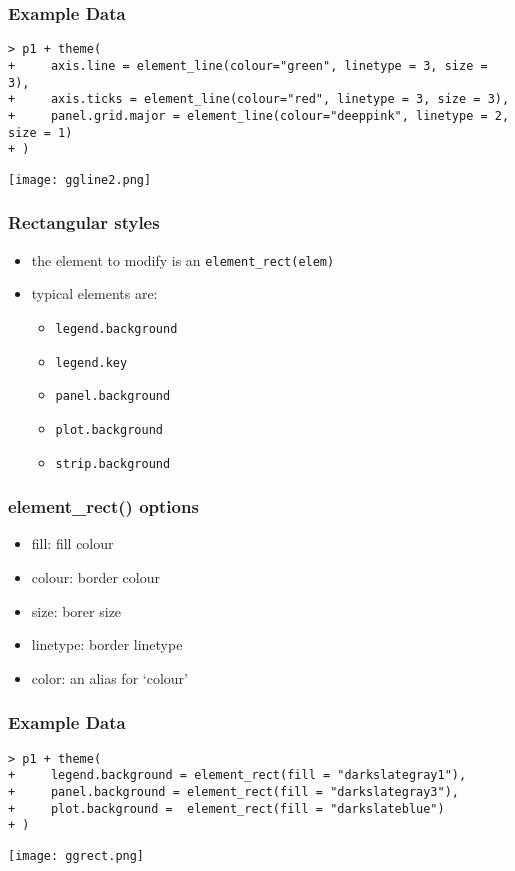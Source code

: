 \begin{frame}\frametitle{Example Data}
\scriptsize
\begin{verbatim}
> p1 + theme(
+     axis.line = element_line(colour="green", linetype = 3, size = 3),
+     axis.ticks = element_line(colour="red", linetype = 3, size = 3),
+     panel.grid.major = element_line(colour="deeppink", linetype = 2, size = 1)
+ )
\end{verbatim}
  \begin{center}
    \texttt{[image: ggline2.png]}
  \end{center}
\end{frame}



\begin{frame}\frametitle{Rectangular styles}
  \begin{itemize}
  \item the element to modify is an \texttt{element\_rect(elem)}
  \item typical elements are:
    \begin{itemize}
    \item \texttt{legend.background}
    \item \texttt{legend.key} 
    \item \texttt{panel.background}
    \item \texttt{plot.background}
    \item \texttt{strip.background}
    \end{itemize}
  \end{itemize}
\end{frame}

\begin{frame}\frametitle{element\_rect() options}
  \begin{itemize}
  \item fill: fill colour
  \item colour: border colour
  \item size: borer size
  \item linetype: border linetype
  \item color: an alias for ‘colour’ 
  \end{itemize}
\end{frame}


\begin{frame}\frametitle{Example Data}
\scriptsize
\begin{verbatim}
> p1 + theme(
+     legend.background = element_rect(fill = "darkslategray1"),
+     panel.background = element_rect(fill = "darkslategray3"),
+     plot.background =  element_rect(fill = "darkslateblue")
+ )
\end{verbatim}
  \begin{center}
    \texttt{[image: ggrect.png]}
  \end{center}
\end{frame}




